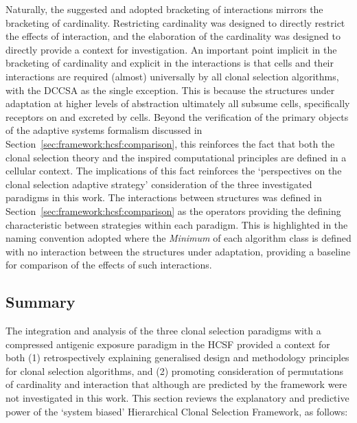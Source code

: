 Naturally, the suggested and adopted bracketing of interactions mirrors the bracketing of cardinality. Restricting cardinality was designed to directly restrict the effects of interaction, and the elaboration of the cardinality was designed to directly provide a context for investigation.
An important point implicit in the bracketing of cardinality and explicit in the interactions is that cells and their interactions are required (almost) universally by all clonal selection algorithms, with the DCCSA as the single exception. This is because the structures under adaptation at higher levels of abstraction ultimately all subsume cells, specifically receptors on and excreted by cells. Beyond the verification of the primary objects of the adaptive systems formalism discussed in Section~\ref{sec:framework:hcsf:comparison}, this reinforces the fact that both the clonal selection theory and the inspired computational principles are defined in a cellular context. The implications of this fact reinforces the `perspectives on the clonal selection adaptive strategy' consideration of the three investigated paradigms in this work. 
The interactions between structures was defined in Section~\ref{sec:framework:hcsf:comparison} as the operators providing the defining characteristic between strategies within each paradigm. This is highlighted in the naming convention adopted where the \emph{Minimum} of each algorithm class is defined with no interaction between the structures under adaptation, providing a baseline for comparison of the effects of such interactions.


%
%
\subsection{Summary}
\label{sec:framework:hcsf:summary}
The integration and analysis of the three clonal selection paradigms with a compressed antigenic exposure paradigm in the HCSF provided a context for both (1) retrospectively explaining generalised design and methodology principles for clonal selection algorithms, and (2) promoting consideration of permutations of cardinality and interaction that although are predicted by the framework were not investigated in this work. This section reviews the explanatory and predictive power of the `system biased' Hierarchical Clonal Selection Framework, as follows:

